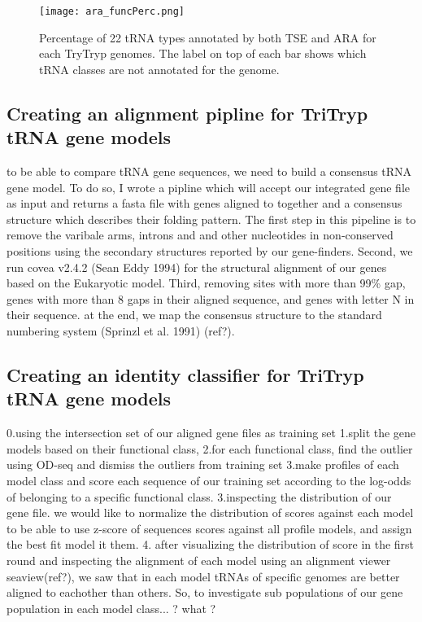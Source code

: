 \documentclass[
10pt, %
a4paper, %
oneside, %
headinclude,footinclude, %
BCOR5mm, %
]{scrartcl}
\begin{document}
\begin{figure}[tb]
\centering 
\texttt{[image: ara\_funcPerc.png]} 
\caption[Genome Comparison]{Percentage of 22 tRNA types annotated by both TSE and ARA for each TryTryp genomes. The label on top of each bar shows which tRNA classes are not annotated for the genome.} %
\label{fig:types} 
\end{figure}

\subsection{Creating an alignment pipline for TriTryp tRNA gene models}
to be able to compare tRNA gene sequences, we need to build a consensus tRNA gene model. To do so, I wrote a pipline which will accept our integrated gene file as input and returns a fasta file with genes aligned to together and a consensus structure which describes their folding pattern. The first step in this pipeline is to remove the varibale arms, introns and and other nucleotides in non-conserved positions using the secondary structures reported by our gene-finders. Second, we run covea v2.4.2 (Sean Eddy 1994) for the structural alignment of our genes based on the Eukaryotic model. Third, removing sites with more than 99\% gap, genes with more than 8 gaps in their aligned sequence, and genes with letter N in their sequence. at the end, we map the consensus structure to the standard numbering system (Sprinzl et al. 1991) (ref?).

\subsection{Creating an identity classifier for TriTryp tRNA gene models}
0.using the intersection set of our aligned gene files as training set
1.split the gene models based on their functional class, 
2.for each functional class, find the outlier using OD-seq and dismiss the outliers from training set
3.make profiles of each model class and score each sequence of our training set according to the log-odds of belonging to a specific functional class.
3.inspecting the distribution of our gene file. we would like to normalize the distribution of scores against each model to be able to use z-score of sequences scores against all profile models, and assign the best fit model it them.
4. after visualizing the distribution of score in the first round and inspecting the alignment of each model using an alignment viewer seaview(ref?), we saw that in each model tRNAs of specific genomes are better aligned to eachother than others. So, to investigate sub populations of our gene population in each model class... ? what ? 
\end{document}

